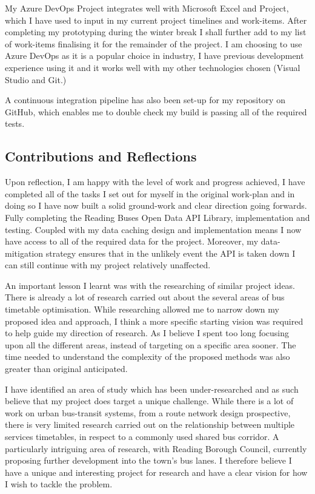 \documentclass{article}
\begin{document}
\par 
My Azure DevOps Project integrates well with Microsoft Excel and Project, which I have used to input in my current project timelines and work-items. After completing my prototyping during the winter break I shall further add to my list of work-items finalising it for the remainder of the project. I am choosing to use Azure DevOps as it is a popular choice in industry, I have previous development experience using it and it works well with my other technologies chosen (Visual Studio and Git.)

\par 
A continuous integration pipeline has also been set-up for my repository on GitHub, which enables me to double check my build is passing all of the required tests. 




\subsection{Contributions and Reflections}
Upon reflection, I am happy with the level of work and progress achieved, I have completed all of the tasks I set out for myself in the original work-plan and in doing so I have now built a solid ground-work and clear direction going forwards. Fully completing the Reading Buses Open Data API Library, implementation and testing. Coupled with my data caching design and implementation means I now have access to all of the required data for the project. Moreover, my data-mitigation strategy ensures that in the unlikely event the API is taken down I can still continue with my project relatively unaffected. 


\par 

An important lesson I learnt was with the researching of similar project ideas. There is already a lot of research carried out about the several areas of bus timetable optimisation. While researching allowed me to narrow down my proposed idea and approach, I think a more specific starting vision was required to help guide my direction of research. As I believe I spent too long focusing upon all the different areas, instead of targeting on a specific area sooner. The time needed to understand the complexity of the proposed methods was also greater than original anticipated. 


\par 
I have identified an area of study which has been under-researched and as such believe that my project does target a unique challenge. While there is a lot of work on urban bus-transit systems, from a route network design prospective, there is very limited research carried out on the relationship between multiple services timetables, in respect to a commonly used shared bus corridor. A particularly intriguing area of research, with Reading Borough Council, currently proposing further development into the town's bus lanes. I therefore believe I have a unique and interesting project for research and have a clear vision for how I wish to tackle the problem.

\vspace{2em}

{}
\printbibliography %
\end{document}
